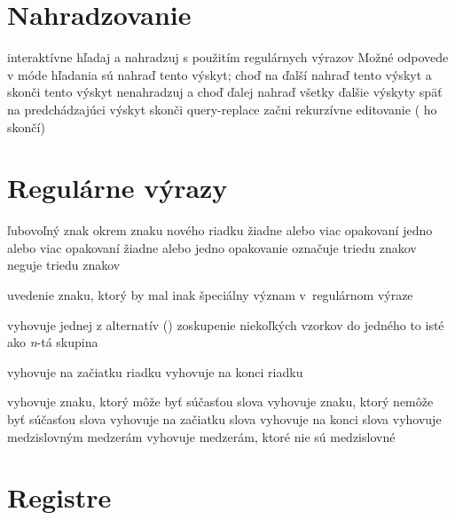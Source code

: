 \section{Nahradzovanie}

 interaktívne hľadaj a nahradzuj
 s použitím regulárnych výrazov
\askip
Možné odpovede v móde hľadania sú
\askip
{} nahraď tento výskyt; choď na ďalší
\key{,} nahraď tento výskyt a skonči
 tento výskyt nenahradzuj a choď ďalej
\key{!} nahraď všetky ďalšie výskyty
\key{\^{}} späť na predchádzajúci výskyt
 skonči query-replace
 začni rekurzívne editovanie ( ho skončí)

\section{Regulárne výrazy}

 ľubovoľný znak okrem znaku nového riadku
\key{*} žiadne alebo viac opakovaní
\key{+} jedno alebo viac opakovaní
 žiadne alebo jedno opakovanie
\key{[$\ldots$]} označuje triedu znakov
\key{[\^{}$\ldots$]} neguje triedu znakov

 uvedenie znaku, ktorý by mal inak špeciálny význam
v~regulárnom výraze

\key{$\ldots$\\|$\ldots$\\|$\ldots$} vyhovuje jednej z alternatív ()
\key{\\( $\ldots$ \\)} zoskupenie niekoľkých vzorkov do jedného
 to isté ako {\it n\/}-tá skupina

\key{\^{}} vyhovuje na začiatku riadku
\key{\$} vyhovuje na konci riadku

\key{\\w} vyhovuje znaku, ktorý môže byť súčasťou slova
\key{\\W} vyhovuje znaku, ktorý nemôže byť súčasťou slova
\key{\\<} vyhovuje na začiatku slova
\key{\\>} vyhovuje na konci slova
\key{\\b} vyhovuje medzislovným medzerám
\key{\\B} vyhovuje medzerám, ktoré nie sú medzislovné

\section{Registre}

